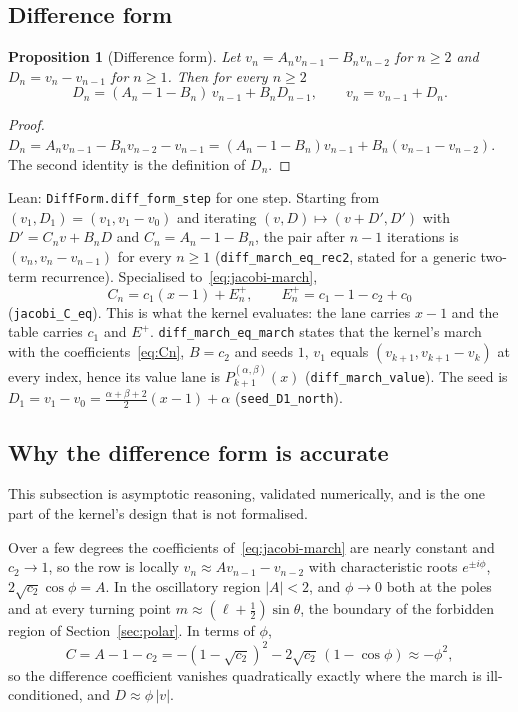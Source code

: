 \documentclass[usenatbib,useAMS]{mnras}
\newtheorem{proposition}{Proposition}
\begin{document}
\subsection{Difference form}
\label{sec:diff}

\begin{proposition}[Difference form]
\label{prop:diff}
Let $v_n=A_nv_{n-1}-B_nv_{n-2}$ for $n\ge2$ and $D_n=v_n-v_{n-1}$ for $n\ge1$. Then for every $n\ge2$
\begin{equation}
\label{eq:diff}
  D_n=(A_n-1-B_n)\,v_{n-1}+B_n D_{n-1},\qquad v_n=v_{n-1}+D_n .
\end{equation}
\end{proposition}

\begin{proof}
$D_n=A_nv_{n-1}-B_nv_{n-2}-v_{n-1}=(A_n-1-B_n)v_{n-1}+B_n(v_{n-1}-v_{n-2})$. The second identity is the definition of $D_n$.
\end{proof}

Lean: \texttt{DiffForm.diff\_form\_step} for one step. Starting from $(v_1,D_1)=(v_1,v_1-v_0)$ and iterating $(v,D)\mapsto(v+D',D')$ with $D'=C_nv+B_nD$ and $C_n=A_n-1-B_n$, the pair after $n-1$ iterations is $(v_n,v_n-v_{n-1})$ for every $n\ge1$ (\texttt{diff\_march\_eq\_rec2}, stated for a generic two-term recurrence). Specialised to~\eqref{eq:jacobi-march},
\begin{equation}
\label{eq:Cn}
  C_n=c_1(x-1)+E^+_n,\qquad E^+_n=c_1-1-c_2+c_0
\end{equation}
(\texttt{jacobi\_C\_eq}). This is what the kernel evaluates: the lane carries $x-1$ and the table carries $c_1$ and $E^+$. \texttt{diff\_march\_eq\_march} states that the kernel's march with the coefficients~\eqref{eq:Cn}, $B=c_2$ and seeds $1,\,v_1$ equals $(v_{k+1},v_{k+1}-v_k)$ at every index, hence its value lane is $P^{(\alpha,\beta)}_{k+1}(x)$ (\texttt{diff\_march\_value}). The seed is $D_1=v_1-v_0=\tfrac{\alpha+\beta+2}{2}(x-1)+\alpha$ (\texttt{seed\_D1\_north}).

\subsection{Why the difference form is accurate}
\label{sec:why}

This subsection is asymptotic reasoning, validated numerically, and is the one part of the kernel's design that is not formalised.

Over a few degrees the coefficients of~\eqref{eq:jacobi-march} are nearly constant and $c_2\to1$, so the row is locally $v_n\approx Av_{n-1}-v_{n-2}$ with characteristic roots $e^{\pm i\phi}$, $2\sqrt{c_2}\cos\phi=A$. In the oscillatory region $\lvert A\rvert<2$, and $\phi\to0$ both at the poles and at every turning point $m\approx(\ell+\tfrac12)\sin\theta$, the boundary of the forbidden region of Section~\ref{sec:polar}. In terms of $\phi$,
\begin{equation}
  C=A-1-c_2=-(1-\sqrt{c_2})^2-2\sqrt{c_2}\,(1-\cos\phi)\approx-\phi^2,
\end{equation}
so the difference coefficient vanishes quadratically exactly where the march is ill-conditioned, and $D\approx\phi\,\lvert v\rvert$.
\end{document}
